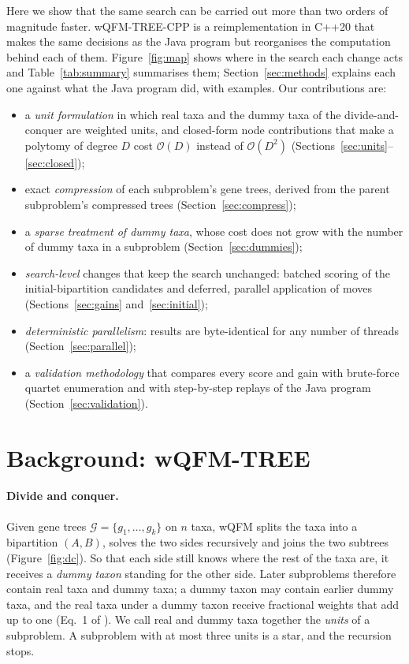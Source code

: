 \documentclass[11pt,a4paper]{article}
\newcommand{\wqfmtree}{wQFM-TREE}
\newcommand{\cpp}{wQFM-TREE-CPP}
\newcommand{\Oh}{\mathcal{O}}
\begin{document}
Here we show that the same search can be carried out more than two orders of magnitude faster.
\cpp{} is a reimplementation in C++20 that makes the same decisions as the Java program but
reorganises the computation behind each of them. Figure~\ref{fig:map} shows where in the search
each change acts and Table~\ref{tab:summary} summarises them; Section~\ref{sec:methods} explains
each one against what the Java program did, with examples. Our contributions are:
\begin{itemize}
\item a \emph{unit formulation} in which real taxa and the dummy taxa of the divide-and-conquer are
  weighted units, and closed-form node contributions that make a polytomy of degree $D$ cost
  $\Oh(D)$ instead of $\Oh(D^2)$ (Sections~\ref{sec:units}--\ref{sec:closed});
\item exact \emph{compression} of each subproblem's gene trees, derived from the parent
  subproblem's compressed trees (Section~\ref{sec:compress});
\item a \emph{sparse treatment of dummy taxa}, whose cost does not grow with the number of dummy
  taxa in a subproblem (Section~\ref{sec:dummies});
\item \emph{search-level} changes that keep the search unchanged: batched scoring of the
  initial-bipartition candidates and deferred, parallel application of moves
  (Sections~\ref{sec:gains} and~\ref{sec:initial});
\item \emph{deterministic parallelism}: results are byte-identical for any number of threads
  (Section~\ref{sec:parallel});
\item a \emph{validation methodology} that compares every score and gain with brute-force quartet
  enumeration and with step-by-step replays of the Java program (Section~\ref{sec:validation}).
\end{itemize}

\section{Background: \wqfmtree}\label{sec:background}

\paragraph{Divide and conquer.} Given gene trees $\mathcal{G}=\{g_1,\dots,g_k\}$ on $n$ taxa, wQFM
\citep{reaz2014qfm,mahbub2021wqfm} splits the taxa into a bipartition $(A,B)$, solves the two
sides recursively and joins the two subtrees (Figure~\ref{fig:dc}). So that each side still knows
where the rest of the taxa are, it receives a \emph{dummy taxon} standing for the other side. Later
subproblems therefore contain real taxa and dummy taxa; a dummy taxon may contain earlier dummy
taxa, and the real taxa under a dummy taxon receive fractional weights that add up to one (Eq.~1
of \citep{rafi2025wqfmtree}). We call real and dummy taxa together the \emph{units} of a
subproblem. A subproblem with at most three units is a star, and the recursion stops.
\end{document}

